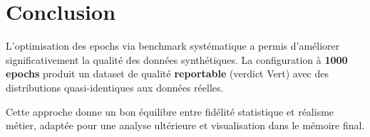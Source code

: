 \documentclass[11pt,a4paper]{article}
\begin{document}
\section{Conclusion}

L'optimisation des epochs via benchmark systématique a permis d'améliorer significativement la qualité des données synthétiques. La configuration à \textbf{1000 epochs} produit un dataset de qualité \textbf{reportable} (verdict Vert) avec des distributions quasi-identiques aux données réelles.

Cette approche donne un bon équilibre entre fidélité statistique et réalisme métier, adaptée pour une analyse ultérieure et visualisation dans le mémoire final.
\end{document}
